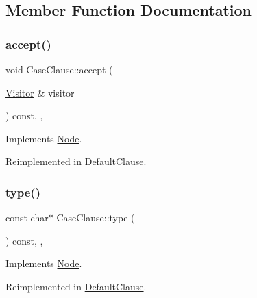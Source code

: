 \subsection{Member Function Documentation}
\mbox{\label{struct_case_clause_a5bbee9ea9ca206c09b8b79f8c96720a1}} 
\subsubsection{\texorpdfstring{accept()}{accept()}}
{\footnotesize\ttfamily void Case\+Clause\+::accept (\begin{DoxyParamCaption}\item[{\hyperlink{struct_visitor}{Visitor} \&}]{visitor }\end{DoxyParamCaption}) const\hspace{0.3cm}{\ttfamily [inline]}, {\ttfamily [override]}, {\ttfamily [virtual]}}



Implements \hyperlink{struct_node_a10bd7af968140bbf5fa461298a969c71}{Node}.



Reimplemented in \hyperlink{struct_default_clause_ade62e79cf9ad891d974528e1e172e2b6}{Default\+Clause}.

\mbox{\label{struct_case_clause_a9dcb0a1a072df7d577b272c6bbb3c6dc}} 
\subsubsection{\texorpdfstring{type()}{type()}}
{\footnotesize\ttfamily const char$\ast$ Case\+Clause\+::type (\begin{DoxyParamCaption}{ }\end{DoxyParamCaption}) const\hspace{0.3cm}{\ttfamily [inline]}, {\ttfamily [override]}, {\ttfamily [virtual]}}



Implements \hyperlink{struct_node_a82f29420d0a38efcc370352528e94e9b}{Node}.



Reimplemented in \hyperlink{struct_default_clause_a464358dcd7e4e13287482d3c858f3538}{Default\+Clause}.



